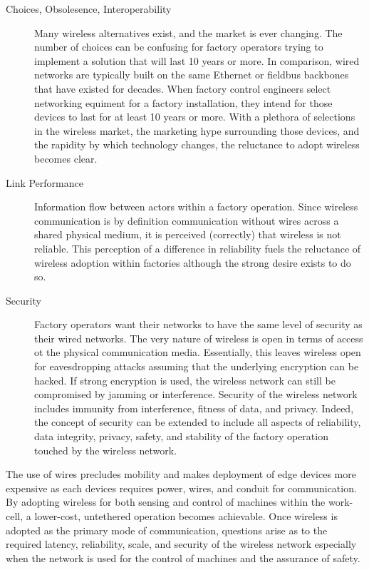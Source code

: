 {\begin{description}	
	
	\item[Choices, Obsolesence, Interoperability] Many wireless alternatives exist, and the market is ever changing.  The number of choices can be confusing for factory operators trying to implement a solution that will last 10 years or more.  In comparison, wired networks are typically built on the same Ethernet or fieldbus backbones that have existed for decades. When factory control engineers select networking equiment for a factory installation, they intend for those devices to last for at least 10 years or more.  With a plethora of selections in the wireless market, the marketing hype surrounding those devices, and the rapidity by which technology changes, the reluctance to adopt wireless becomes clear.  
	
	\item[Link Performance] Information flow between actors within a factory operation.  Since wireless communication is by definition communication without wires across a shared physical medium, it is perceived (correctly) that wireless is not reliable.  This perception of a difference in reliability fuels the reluctance of wireless adoption within factories although the strong desire exists to do so.
	
	\item[Security] Factory operators want their networks to have the same level of security as their wired networks.  The very nature of wireless is open in terms of access ot the physical communication media.  Essentially, this leaves wireless open for eavesdropping attacks assuming that the underlying encryption can be hacked.  If strong encryption is used, the wireless network can still be compromised by jamming or interference.  Security of the wireless network includes immunity from interference, fitness of data, and privacy.  Indeed, the concept of security can be extended to include all aspects of reliability, data integrity, privacy, safety, and stability of the factory operation touched by the wireless network.	
	
\end{description}

The use of wires precludes mobility and makes deployment of edge devices more expensive as each devices requires power, wires, and conduit for communication. By adopting wireless for both sensing and control of machines within the work-cell, a lower-cost, untethered operation becomes achievable. Once wireless is adopted as the primary mode of communication, questions arise as to the required latency, reliability, scale, and security of the wireless network especially when the network is used for the control of machines and the assurance of safety. 

}
